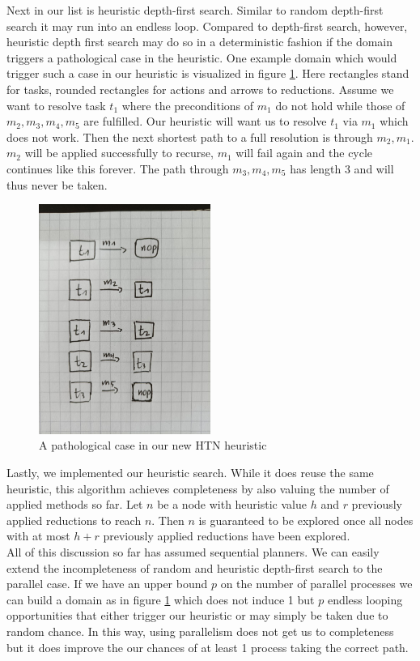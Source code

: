Next in our list is heuristic depth-first search. Similar to random depth-first search it may run into an endless loop. Compared to depth-first search, however, heuristic depth first search may do so in a deterministic fashion if the domain triggers a pathological case in the heuristic. One example domain which would trigger such a case in our heuristic is visualized in figure \ref{figure: improv heuristic pathological}. Here rectangles stand for tasks, rounded rectangles for actions and arrows to reductions. Assume we want to resolve task $t_1$ where the preconditions of $m_1$ do not hold while those of $m_2, m_3, m_4, m_5$ are fulfilled. Our heuristic will want us to resolve $t_1$ via $m_1$ which does not work. Then the next shortest path to a full resolution is through $m_2, m_1$. $m_2$ will be applied successfully to recurse, $m_1$ will fail again and the cycle continues like this forever. The path through $m_3, m_4, m_5$ has length 3 and will thus never be taken. \\ 
\begin{figure}
	\caption{A pathological case in our new HTN heuristic}
	\label{figure: improv heuristic pathological}
	\includegraphics[width=0.5\textwidth]{images/prelim/improv_heuristic_pathological}
\end{figure}
Lastly, we implemented our heuristic search. While it does reuse the same heuristic, this algorithm achieves completeness by also valuing the number of applied methods so far. Let $n$ be a node with heuristic value $h$ and $r$ previously applied reductions to reach $n$. Then $n$ is guaranteed to be explored once all nodes with at most $h + r$ previously applied reductions have been explored. \\
All of this discussion so far has assumed sequential planners. We can easily extend the incompleteness of random and heuristic depth-first search to the parallel case. If we have an upper bound $p$ on the number of parallel processes we can build a domain as in figure \ref{figure: improv heuristic pathological} which does not induce 1 but $p$ endless looping opportunities that either trigger our heuristic or may simply be taken due to random chance. In this way, using parallelism does not get us to completeness but it does improve the our chances of at least 1 process taking the correct path.

